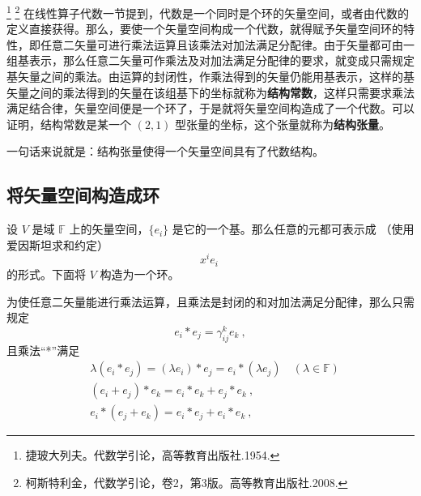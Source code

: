 
\footnote{捷玻大列夫。代数学引论，高等教育出版社.1954.}
\footnote{柯斯特利金，代数学引论，卷2，第3版。高等教育出版社.2008.} 在线性算子代数一节提到，代数是一个同时是个环的矢量空间，或者由代数的定义直接获得。那么，要使一个矢量空间构成一个代数，就得赋予矢量空间环的特性，即任意二矢量可进行乘法运算且该乘法对加法满足分配律。由于矢量都可由一组基表示，那么任意二矢量可作乘法及对加法满足分配律的要求，就变成只需规定基矢量之间的乘法。由运算的封闭性，作乘法得到的矢量仍能用基表示，这样的基矢量之间的乘法得到的矢量在该组基下的坐标就称为\textbf{结构常数}，这样只需要求乘法满足结合律，矢量空间便是一个环了，于是就将矢量空间构造成了一个代数。可以证明，结构常数是某一个 $(2,1)$ 型张量的坐标，这个张量就称为\textbf{结构张量}。 

一句话来说就是：结构张量使得一个矢量空间具有了代数结构。

\subsection{将矢量空间构造成环}
设 $V$ 是域 $\mathbb F$ 上的矢量空间，$\{e_i\}$ 是它的一个基。那么任意的元都可表示成 （使用爱因斯坦求和约定）
\begin{equation}
x^i e_i~
\end{equation}
的形式。下面将 $V$ 构造为一个环。

为使任意二矢量能进行乘法运算，且乘法是封闭的和对加法满足分配律，那么只需规定
\begin{equation}\label{eq_STAlg_1}
e_i*e_j=\gamma_{ij}^k e_k~,
\end{equation}
且乘法“*”满足
\begin{equation}
\begin{aligned}
&\lambda(e_i*e_j)=(\lambda e_i)*e_j=e_i*(\lambda e_j)\quad (\lambda\in\mathbb F)\\
&(e_i+e_j)*e_k=e_i*e_k+e_j*e_k~,\\
&e_i*(e_j+e_k)=e_i*e_j+e_i*e_k~,
\end{aligned}
\end{equation}

